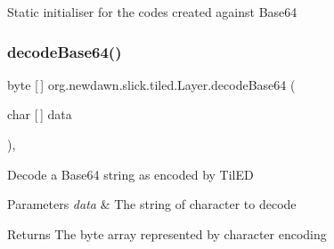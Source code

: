 Static initialiser for the codes created against Base64 \mbox{\label{classorg_1_1newdawn_1_1slick_1_1tiled_1_1_layer_af31e22c2a21a77e000afee8a40393019}} 
\subsubsection{\texorpdfstring{decode\+Base64()}{decodeBase64()}}
{\footnotesize\ttfamily byte \mbox{[}$\,$\mbox{]} org.\+newdawn.\+slick.\+tiled.\+Layer.\+decode\+Base64 (\begin{DoxyParamCaption}\item[{char \mbox{[}$\,$\mbox{]}}]{data }\end{DoxyParamCaption})\hspace{0.3cm}{\ttfamily [inline]}, {\ttfamily [private]}}

Decode a Base64 string as encoded by Til\+ED


\begin{DoxyParams}{Parameters}
{\em data} & The string of character to decode \\
\hline
\end{DoxyParams}
\begin{DoxyReturn}{Returns}
The byte array represented by character encoding 
\end{DoxyReturn}

